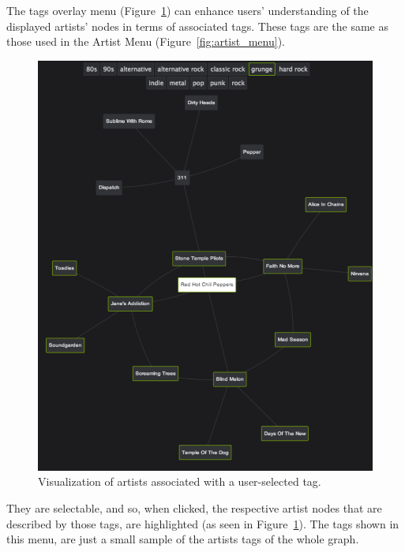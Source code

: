 \documentclass{article}
\begin{document}
      The tags overlay menu (Figure~\ref{fig:tags_overlay}) can enhance users' understanding of the displayed artists' nodes in terms of associated tags. These tags are the same as those used in the Artist Menu (Figure~\ref{fig:artist_menu}).
      \begin{figure}[th]
        \begin{center}
          \includegraphics[width=\columnwidth]{../report/figures/tags_overlay.pdf}
        \end{center}
        \caption{Visualization of artists associated with a user-selected tag.}
        \label{fig:tags_overlay}
      \end{figure}
      They are selectable, and so, when clicked, the respective artist nodes that are described by those tags, are highlighted (as seen in Figure~\ref{fig:tags_overlay}).
      The tags shown in this menu, are just a small sample of the artists tags of the whole graph.


% 

\end{document}
